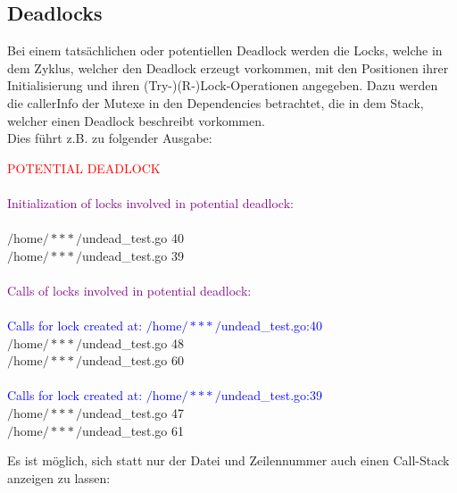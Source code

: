 \subsection{Deadlocks}
Bei einem tatsächlichen oder potentiellen Deadlock werden die Locks, welche in 
dem Zyklus, welcher den Deadlock erzeugt vorkommen, mit den Positionen
ihrer Initialisierung und ihren (Try-)(R-)Lock-Operationen angegeben. Dazu 
werden die callerInfo der Mutexe in den 
Dependencies betrachtet, die in dem Stack, welcher einen Deadlock beschreibt 
vorkommen.\\
Dies führt z.B. zu folgender Ausgabe:
\begin{mdframed}
\textcolor{red}{POTENTIAL DEADLOCK}\\
\\
\textcolor{purple}{Initialization of locks involved in potential deadlock:}\\
\\
$/$home$/***/$undead\_test.go 40\\
$/$home$/***/$undead\_test.go 39\\
\\
\textcolor{purple}{Calls of locks involved in potential deadlock:}\\
\\
\textcolor{blue}{Calls for lock created at: $/$home$/***/$undead\_test.go:40}\\
$/$home$/***/$undead\_test.go 48\\
$/$home$/***/$undead\_test.go 60\\
\\
\textcolor{blue}{Calls for lock created at: $/$home$/***/$undead\_test.go:39}\\
$/$home$/***/$undead\_test.go 47\\
$/$home$/***/$undead\_test.go 61
\end{mdframed}
Es ist möglich, sich statt nur der Datei und Zeilennummer auch einen 
Call-Stack anzeigen zu lassen:

